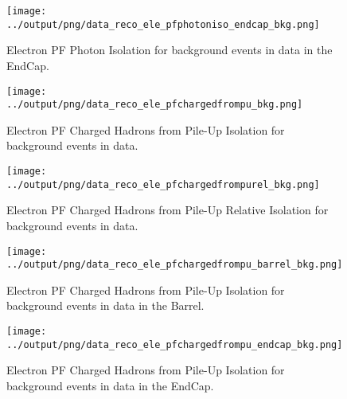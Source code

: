 \documentclass[11pt]{book}
\begin{document}
\begin{figure}[htb]
\centering
\texttt{[image: ../output/png/data\_reco\_ele\_pfphotoniso\_endcap\_bkg.png]}
\caption{Electron PF Photon Isolation for background events in data in the EndCap.}
\label{fig:data_ele_pfphotoniso_endcap_bkg}
\end{figure}


\begin{figure}[htb]
\centering
\texttt{[image: ../output/png/data\_reco\_ele\_pfchargedfrompu\_bkg.png]}
\caption{Electron PF Charged Hadrons from Pile-Up Isolation for background events in data.}
\label{fig:data_ele_pfchargedfrompu_bkg}
\end{figure}

\begin{figure}[htb]
\centering
\texttt{[image: ../output/png/data\_reco\_ele\_pfchargedfrompurel\_bkg.png]}
\caption{Electron PF Charged Hadrons from Pile-Up Relative Isolation for background events in data.}
\label{fig:data_ele_pfchargedfrompurel_bkg}
\end{figure}

\begin{figure}[htb]
\centering
\texttt{[image: ../output/png/data\_reco\_ele\_pfchargedfrompu\_barrel\_bkg.png]}
\caption{Electron PF Charged Hadrons from Pile-Up Isolation for background events in data in the Barrel.}
\label{fig:data_ele_pfchargedfrompu_barrel_bkg}
\end{figure}

\begin{figure}[htb]
\centering
\texttt{[image: ../output/png/data\_reco\_ele\_pfchargedfrompu\_endcap\_bkg.png]}
\caption{Electron PF Charged Hadrons from Pile-Up Isolation for background events in data in the EndCap.}
\label{fig:data_ele_pfchargedfrompu_endcap_bkg}
\end{figure}
\end{document}
